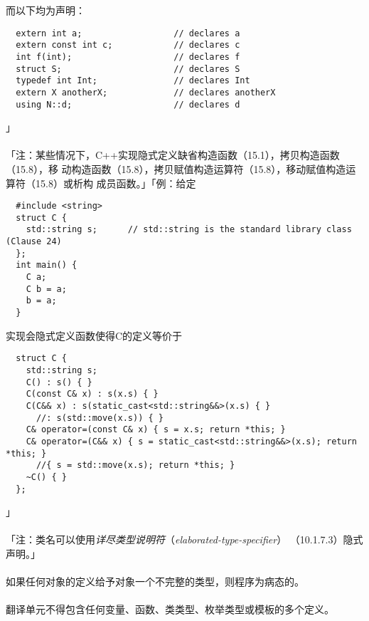 而以下均为声明：
\begin{lstlisting}
  extern int a;                  // declares a
  extern const int c;            // declares c
  int f(int);                    // declares f
  struct S;                      // declares S
  typedef int Int;               // declares Int
  extern X anotherX;             // declares anotherX
  using N::d;                    // declares d
\end{lstlisting}
」

\paragraph{}
「注：某些情况下，C++实现隐式定义缺省构造函数（15.1），拷贝构造函数（15.8），移
动构造函数（15.8），拷贝赋值构造运算符（15.8），移动赋值构造运算符（15.8）或析构
成员函数。」「例：给定
\begin{lstlisting}
  #include <string>
  struct C {
    std::string s;      // std::string is the standard library class (Clause 24)
  };
  int main() {
    C a;
    C b = a;
    b = a;
  }
\end{lstlisting}
实现会隐式定义函数使得C的定义等价于
\begin{lstlisting}
  struct C {
    std::string s;
    C() : s() { }
    C(const C& x) : s(x.s) { }
    C(C&& x) : s(static_cast<std::string&&>(x.s) { }
      //: s(std::move(x.s)) { }
    C& operator=(const C& x) { s = x.s; return *this; }
    C& operator=(C&& x) { s = static_cast<std::string&&>(x.s); return *this; }
      //{ s = std::move(x.s); return *this; }
    ~C() { }
  };
\end{lstlisting}」

\paragraph{}
「注：类名可以使用\textit{详尽类型说明符}（\textit{elaborated-type-specifier}）
（10.1.7.3）隐式声明。」

\paragraph{}
如果任何对象的定义给予对象一个不完整的类型，则程序为病态的。



\paragraph{}
翻译单元不得包含任何变量、函数、类类型、枚举类型或模板的多个定义。

